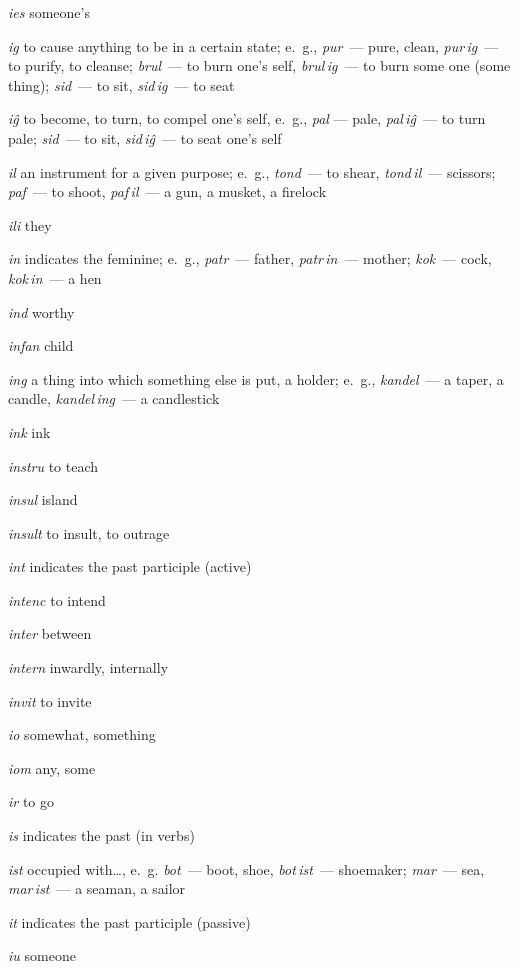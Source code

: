 \begin{landscape}
\begin{multicols}{5}
\begin{outdent}{1em}
\emph{ies}  someone’s

\emph{ig}  to cause anything to be in a certain state; e.~g., \emph{pur\,} — pure, clean, \emph{pur\,ig\,} — to purify, to cleanse; \emph{brul\,} — to burn one’s self, \emph{brul\,ig\,} — to burn some one (some thing); \emph{sid\,} — to sit, \emph{sid\,ig\,} — to seat

\emph{iĝ}  to become, to turn, to compel one’s self, e.~g., \emph{pal} — pale, \emph{pal\,iĝ\,} — to turn pale; \emph{sid\,} — to sit, \emph{sid\,iĝ\,} — to seat one’s self

\emph{il}  an instrument for a given purpose; e.~g., \emph{tond\,} — to shear, \emph{tond\,il\,} — scissors; \emph{paf\,} — to shoot, \emph{paf\,il\,} — a gun, a musket, a firelock

\emph{ili}  they

\emph{in}  indicates the feminine; e.~g., \emph{patr\,} — father, \emph{patr\,in\,} — mother; \emph{kok\,} — cock, \emph{kok\,in\,} — a hen

\emph{ind}  worthy

\emph{infan } child

\emph{ing}  a thing into which something else is put, a holder; e.~g., \emph{kandel\,} — a taper, a candle, \emph{kandel\,ing\,} — a candlestick

\emph{ink}  ink

\emph{instru}  to teach

\emph{insul}  island

\emph{insult}  to insult, to outrage

\emph{int  }indicates the past participle (active)

\emph{intenc}  to intend

\emph{inter  }between

\emph{intern}  inwardly, internally

\emph{invit}  to invite

\emph{io}  somewhat, something

\emph{iom}  any, some

\emph{ir}  to go

\emph{is}  indicates the past (in verbs)

\emph{ist } occupied with…, e.~g. \emph{bot\,} — boot, shoe, \emph{bot\,ist\,} — shoemaker; \emph{mar\,} — sea, \emph{mar\,ist\,} — a seaman, a sailor

\emph{it } indicates the past participle (passive)

\emph{iu}  someone
\end{outdent}


\end{multicols}
\end{landscape}
